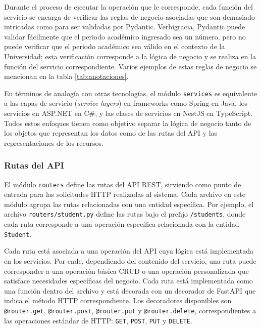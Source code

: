 Durante el proceso de ejecutar la operación que le corresponde, cada función del servicio se encarga de verificar las reglas de negocio asociadas que son demasiado intricadas como para ser validadas por \gls{Pydantic}. Verbigracia, \gls{Pydantic} puede validar fácilmente que el periodo académico ingresado sea un número, pero no puede verificar que el periodo académico sea válido en el contexto de la Universidad; esta verificación corresponde a la lógica de negocio y se realiza en la función del servicio correspondiente. Varios ejemplos de estas reglas de negocio se mencionan en la tabla \ref{tab:anotaciones}.

En términos de analogía con otras tecnologías, el módulo \lstinline|services| es equivalente a las capas de servicio (\textit{service layers}) en frameworks como Spring en Java, los servicios en ASP.NET en C\#, y las clases de servicios en NestJS en TypeScript. Todos estos enfoques tienen como objetivo separar la lógica de negocio tanto de los objetos que representan los datos como de las rutas del API y las representaciones de los recursos.

\subsubsection{Rutas del API}
El módulo \lstinline|routers| define las rutas del \gls{API REST}, sirviendo como punto de entrada para las solicitudes \gls{HTTP} realizadas al sistema. Cada archivo en este módulo agrupa las rutas relacionadas con una entidad específica. Por ejemplo, el archivo \lstinline|routers/student.py| define las rutas bajo el prefijo \lstinline|/students|, donde cada ruta corresponde a una operación específica relacionada con la entidad \lstinline|Student|.

Cada ruta está asociada a una operación del \gls{API} cuya lógica está implementada en los servicios. Por ende, dependiendo del contenido del servicio, una ruta puede corresponder a una operación básica \gls{CRUD} o una operación personalizada que satisface necesidades específicas del negocio. Cada ruta está implementada como una función dentro del archivo y está decorada con un decorador de \gls{FastAPI} que indica el método \gls{HTTP} correspondiente. Los decoradores disponibles son \lstinline|@router.get|, \lstinline|@router.post|, \lstinline|@router.put| y \lstinline|@router.delete|, correspondientes a las operaciones estándar de \gls{HTTP}: \lstinline|GET|, \lstinline|POST|, \lstinline|PUT| y \lstinline|DELETE|.

